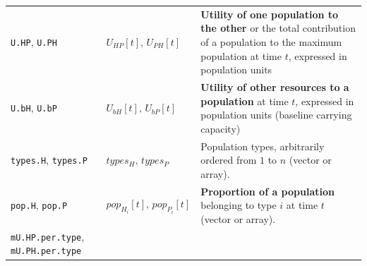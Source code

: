 \documentclass[]{book}
\begin{document}
\begin{longtable}[]{@{}lll@{}}
\begin{minipage}[t]{0.36\columnwidth}
\texttt{U.HP}, \texttt{U.PH}\strut
\end{minipage} & \begin{minipage}[t]{0.21\columnwidth}\raggedright
\(U_{HP}[t],\,U_{PH}[t]\)\strut
\end{minipage} & \begin{minipage}[t]{0.34\columnwidth}\raggedright
\textbf{Utility of one population to the other} or the total contribution of a population to the maximum population at time \(t\), expressed in population units\strut
\end{minipage}\tabularnewline
\begin{minipage}[t]{0.36\columnwidth}\raggedright
\texttt{U.bH}, \texttt{U.bP}\strut
\end{minipage} & \begin{minipage}[t]{0.21\columnwidth}\raggedright
\(U_{bH}[t],\,U_{bP}[t]\)\strut
\end{minipage} & \begin{minipage}[t]{0.34\columnwidth}\raggedright
\textbf{Utility of other resources to a population} at time \(t\), expressed in population units (baseline carrying capacity)\strut
\end{minipage}\tabularnewline
\begin{minipage}[t]{0.36\columnwidth}\raggedright
\texttt{types.H}, \texttt{types.P}\strut
\end{minipage} & \begin{minipage}[t]{0.21\columnwidth}\raggedright
\(types_{H},\,types_{P}\)\strut
\end{minipage} & \begin{minipage}[t]{0.34\columnwidth}\raggedright
Population types, arbitrarily ordered from \(1\) to \(n\) (vector or array).\strut
\end{minipage}\tabularnewline
\begin{minipage}[t]{0.36\columnwidth}\raggedright
\texttt{pop.H}, \texttt{pop.P}\strut
\end{minipage} & \begin{minipage}[t]{0.21\columnwidth}\raggedright
\(pop_{H_{i}}[t],\,pop_{P_{i}}[t]\)\strut
\end{minipage} & \begin{minipage}[t]{0.34\columnwidth}\raggedright
\textbf{Proportion of a population} belonging to type \(i\) at time \(t\) (vector or array).\strut
\end{minipage}\tabularnewline
\begin{minipage}[t]{0.36\columnwidth}\raggedright
\texttt{mU.HP.per.type}, \texttt{mU.PH.per.type}\strut

\end{minipage}
\end{longtable}
\end{document}
